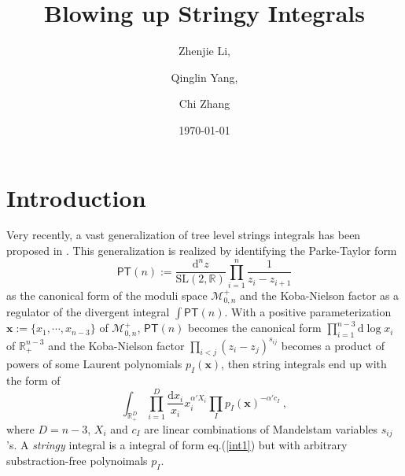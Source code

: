 \documentclass[12pt]{article}
\date{\today}
\title{Blowing up Stringy Integrals}
\author{Zhenjie Li,\and Qinglin Yang,\and Chi Zhang}
\theoremstyle{definition}
\theoremstyle{plain}
\newcommand{\dif}{\mathrm{d}} %
\begin{document}
\maketitle

\section{Introduction}

Very recently, a vast generalization of tree level strings integrals has been proposed in \cite{Arkani-Hamed:2019mrd}. This generalization is realized by identifying the Parke-Taylor form 
\[
	\mathsf{PT}(n):=\frac{\dif^{n}z}{\mathrm{SL}(2,\mathds{R})} \prod_{i=1}^{n}\frac{1}{z_{i}-z_{i+1}}
\]
as the canonical form of the moduli space $\mathcal{M}_{0,n}^{+}$ and the Koba-Nielson factor as a regulator of the divergent integral $\int \mathsf{PT}(n)$. With a positive parameterization  $\mathbf{x}:= \{x_{1},\cdots, x_{n-3}\}$  of $\mathcal{M}_{0,n}^{+}$, $\mathsf{PT}(n)$ becomes the canonical form $\prod_{i=1}^{n-3} \dif \log x_{i}$ of $\mathds{R}_{+}^{n-3}$ and the Koba-Nielson factor $\prod_{i<j} (z_{i}-z_{j})^{s_{ij}}$ becomes a product of powers of some Laurent polynomials $p_{I}(\mathbf{x})$, then string integrals end up with the form of
\begin{equation} 
	\int_{\mathds{R}_{+}^{D}} \prod_{i=1}^{D}\frac{\dif x_{i}}{x_{i}}x_{i}^{\alpha' X_{i}}\prod_{I}p_{I}(\mathbf{x})^{-\alpha'c_{I}}	\:, \label{int1}
\end{equation}
where $D=n{-}3$, $X_{i}$ and $c_{I}$ are linear combinations of Mandelstam variables $s_{ij}$'s. A \emph{stringy} integral is a integral of form eq.(\ref{int1}) but with arbitrary substraction-free polynoimals $p_{I}$. 

\end{document}
